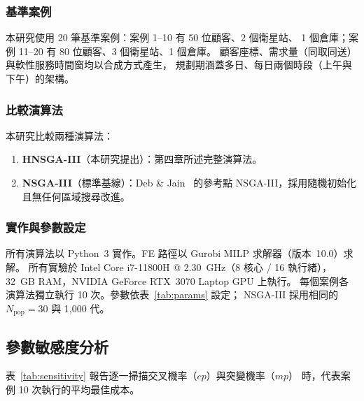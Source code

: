 \documentclass[11pt, a4paper]{article}
\numberwithin{equation}{section}
\begin{document}
\subsubsection{基準案例}

本研究使用 20 筆基準案例：案例 1--10 有 50 位顧客、2 個衛星站、
1 個倉庫；案例 11--20 有 80 位顧客、3 個衛星站、1 個倉庫。
顧客座標、需求量（同取同送）與軟性服務時間窗均以合成方式產生，
規劃期涵蓋多日、每日兩個時段（上午與下午）的架構。

\subsubsection{比較演算法}

本研究比較兩種演算法：
\begin{enumerate}
  \item \textbf{HNSGA-III}（本研究提出）：第四章所述完整演算法。
  \item \textbf{NSGA-III}（標準基線）：Deb \& Jain~\cite{deb2014nsga3}
        的參考點 NSGA-III，採用隨機初始化且無任何區域搜尋改進。
\end{enumerate}

\subsubsection{實作與參數設定}

所有演算法以 Python~3 實作。FE 路徑以 Gurobi MILP 求解器（版本~10.0）求解。
所有實驗於 Intel Core i7-11800H @ 2.30~GHz（8 核心 / 16 執行緒），
32~GB RAM，NVIDIA GeForce RTX~3070 Laptop GPU 上執行。
每個案例各演算法獨立執行 10 次。參數依表~\ref{tab:params} 設定；
NSGA-III 採用相同的 $N_{\mathrm{pop}}=30$ 與 1{,}000 代。

\subsection{參數敏感度分析}

表~\ref{tab:sensitivity} 報告逐一掃描交叉機率（$cp$）與突變機率（$mp$）
時，代表案例 10 次執行的平均最佳成本。
\end{document}
